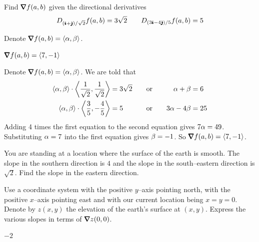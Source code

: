 \begin{question}
Find $\vnabla f(a,b)$ given the directional derivatives
\begin{equation*}
D_{(\hat{\pmb{\imath}}+\hat{\pmb{\jmath}})/\sqrt{2}}f(a,b)=3\sqrt{2}\qquad
D_{(3\hat{\pmb{\imath}}-4\hat{\pmb{\jmath}})/5}f(a,b)=5
\end{equation*}
\end{question}

\begin{hint}
Denote $\vnabla f(a,b)=\llt \al,\be\rgt$.
\end{hint}

\begin{answer}
$\vnabla f(a,b)=\llt 7,-1\rgt$
\end{answer}

\begin{solution}
 Denote $\vnabla f(a,b)=\llt \al,\be\rgt$. We are told that
\begin{alignat*}{5}
\left<\alpha,\beta\right>\cdot\left<\frac{1}{\sqrt{2}},\frac{1}{\sqrt{2}}\right>&=3\sqrt{2} &
&\quad\text{or}\quad &
\alpha+\beta&=6\\
\left<\alpha,\beta\right>\cdot\left<\frac{3}{5},-\frac{4}{5}\right>&=5 &
&\quad\text{or}\quad &
3\alpha-4\beta&=25
\end{alignat*}
Adding 4 times the first equation to the second equation gives $7\alpha=49$.
Substituting $\alpha=7$ into the first equation gives $\beta=-1$. So
$\vnabla f(a,b)=\llt 7,-1\rgt$.
\end{solution}


\begin{question}[M200 2005D] %
You are standing at a location where the surface of the earth is smooth. 
The slope in the southern direction is $4$ and the slope in the south--eastern direction is $\sqrt{2}$. Find the slope in the eastern direction.
\end{question}

\begin{hint}
Use a coordinate system with the positive $y$--axis pointing 
north, with the positive $x$--axis pointing east and with our current
location being $x=y=0$. Denote by $z(x,y)$ the elevation of the 
earth's surface at $(x,y)$. Express the various slopes in terms of
$\vnabla z(0,0)$.
\end{hint}

\begin{answer}
$-2$
\end{answer}

